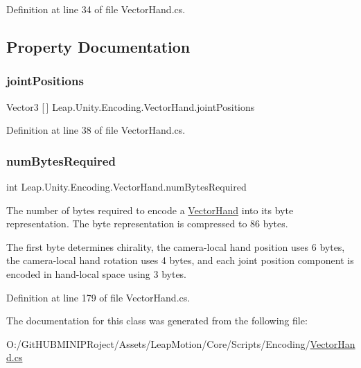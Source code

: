 Definition at line 34 of file Vector\+Hand.\+cs.



\subsection{Property Documentation}
\mbox{\label{class_leap_1_1_unity_1_1_encoding_1_1_vector_hand_a2a4a898bdae166029301d43f161609fc}} 
\subsubsection{\texorpdfstring{jointPositions}{jointPositions}}
{\footnotesize\ttfamily Vector3 \mbox{[}$\,$\mbox{]} Leap.\+Unity.\+Encoding.\+Vector\+Hand.\+joint\+Positions\hspace{0.3cm}{\ttfamily [get]}}



Definition at line 38 of file Vector\+Hand.\+cs.

\mbox{\label{class_leap_1_1_unity_1_1_encoding_1_1_vector_hand_a43a43bf6a938dda526d2114392447bba}} 
\subsubsection{\texorpdfstring{numBytesRequired}{numBytesRequired}}
{\footnotesize\ttfamily int Leap.\+Unity.\+Encoding.\+Vector\+Hand.\+num\+Bytes\+Required\hspace{0.3cm}{\ttfamily [get]}}



The number of bytes required to encode a \mbox{\hyperlink{class_leap_1_1_unity_1_1_encoding_1_1_vector_hand}{Vector\+Hand}} into its byte representation. The byte representation is compressed to 86 bytes. 

The first byte determines chirality, the camera-\/local hand position uses 6 bytes, the camera-\/local hand rotation uses 4 bytes, and each joint position component is encoded in hand-\/local space using 3 bytes. 

Definition at line 179 of file Vector\+Hand.\+cs.



The documentation for this class was generated from the following file\+:\begin{DoxyCompactItemize}
\item 
O\+:/\+Git\+H\+U\+B\+M\+I\+N\+I\+P\+Roject/\+Assets/\+Leap\+Motion/\+Core/\+Scripts/\+Encoding/\mbox{\hyperlink{_vector_hand_8cs}{Vector\+Hand.\+cs}}\end{DoxyCompactItemize}
